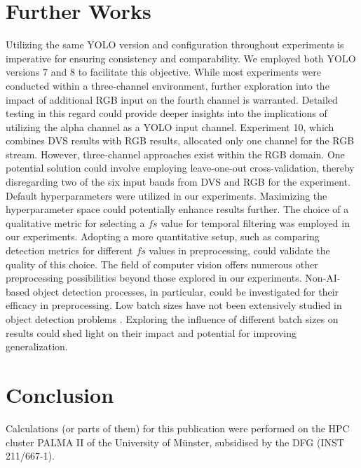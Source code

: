 \documentclass[sigchi,screen]{acmart}
\begin{document}
\section{Further Works}
Utilizing the same YOLO version and configuration throughout experiments is imperative for ensuring consistency and comparability. We employed both YOLO versions 7 and 8 to facilitate this objective. While most experiments were conducted within a three-channel environment, further exploration into the impact of additional RGB input on the fourth channel is warranted. Detailed testing in this regard could provide deeper insights into the implications of utilizing the alpha channel as a YOLO input channel. Experiment 10, which combines DVS results with RGB results, allocated only one channel for the RGB stream. However, three-channel approaches exist within the RGB domain. One potential solution could involve employing leave-one-out cross-validation, thereby disregarding two of the six input bands from DVS and RGB for the experiment. Default hyperparameters were utilized in our experiments. Maximizing the hyperparameter space could potentially enhance results further. The choice of a qualitative metric for selecting a $fs$ value for temporal filtering was employed in our experiments. Adopting a more quantitative setup, such as comparing detection metrics for different $fs$ values in preprocessing, could validate the quality of this choice. The field of computer vision offers numerous other preprocessing possibilities beyond those explored in our experiments. Non-AI-based object detection processes, in particular, could be investigated for their efficacy in preprocessing. Low batch sizes have not been extensively studied in object detection problems \cite{Peng_2018_CVPR}. Exploring the influence of different batch sizes on results could shed light on their impact and potential for improving generalization.
\section{Conclusion}

\begin{acks}
  Calculations (or parts of them) for this publication were performed on the HPC cluster PALMA II of the University of Münster, subsidised by the DFG (INST 211/667-1).
\end{acks}



\pagebreak
\appendix
\end{document}
